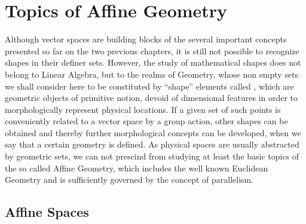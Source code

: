 
\chapter{Topics of Affine Geometry}

Although vector spaces are building blocks of the several important concepts presented so far on the two previous chapters, it is still not possible to recognize shapes in their definer sets. However, the study of mathematical shapes does not belong to Linear Algebra, but to the realms of Geometry, whose non empty sets we shall consider here to be constituted by ``shape'' elements called , which are geometric objects of primitive notion, devoid of dimensional features in order to morphologically represent physical locations. If a given set of such points is conveniently related to a vector space by a group action, other shapes can be obtained and thereby further morphological concepts can be developed, when we say that a certain geometry is defined. As physical spaces are usually abstracted by geometric sets, we can not prescind from studying at least the basic topics of the so called Affine Geometry, which includes the well known Euclidean Geometry and is sufficiently governed by the concept of parallelism.


\section{Affine Spaces}\label{sec:affine}

